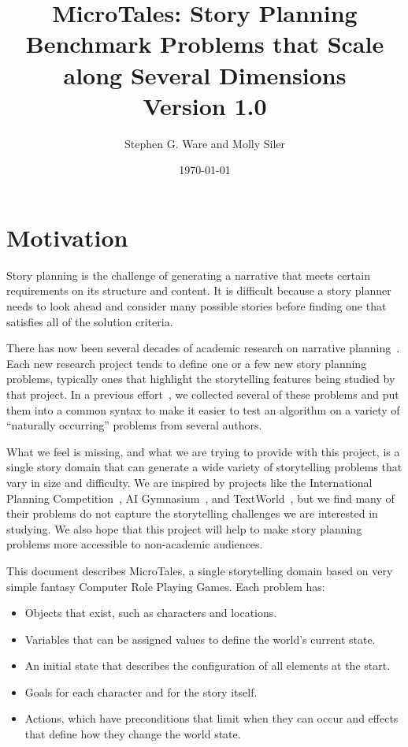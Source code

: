 \documentclass{nilreport}
\title{MicroTales: Story Planning Benchmark Problems that Scale along Several Dimensions\\{\large Version 1.0}}
\author{Stephen G. Ware and Molly Siler}
\date{\today}
\begin{document}
\maketitle

\tableofcontents

\newpage


\section{Motivation}

Story planning is the challenge of generating a narrative that meets certain requirements on its structure and content. It is difficult because a story planner needs to look ahead and consider many possible stories before finding one that satisfies all of the solution criteria.

There has now been several decades of academic research on narrative planning~\cite{young2013plans,kybartas2016survey}. Each new research project tends to define one or a few new story planning problems, typically ones that highlight the storytelling features being studied by that project. In a previous effort~\cite{ware2023collection}, we collected several of these problems and put them into a common syntax to make it easier to test an algorithm on a variety of ``naturally occurring'' problems from several authors.

What we feel is missing, and what we are trying to provide with this project, is a single story domain that can generate a wide variety of storytelling problems that vary in size and difficulty. We are inspired by projects like the International Planning Competition~\cite{taitler2023ipc}, AI Gymnasium~\cite{cote2019textworld}, and TextWorld~\cite{cote2019textworld}, but we find many of their problems do not capture the storytelling challenges we are interested in studying. We also hope that this project will help to make story planning problems more accessible to non-academic audiences.

This document describes MicroTales, a single storytelling domain based on very simple fantasy Computer Role Playing Games. Each problem has:
\begin{itemize}
	\item Objects that exist, such as characters and locations.
	\item Variables that can be assigned values to define the world's current state.
	\item An initial state that describes the configuration of all elements at the start.
  \item Goals for each character and for the story itself.
	\item Actions, which have preconditions that limit when they can occur and effects that define how they change the world state.
\end{itemize}
\end{document}
